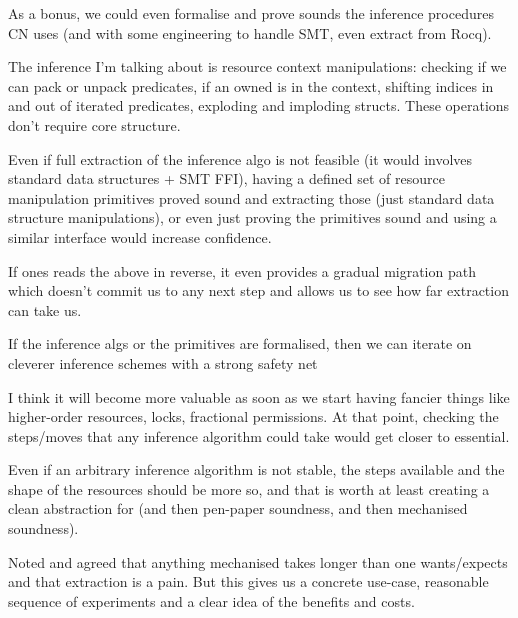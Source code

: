 As a bonus, we could even formalise and prove sounds the inference procedures
CN uses (and with some engineering to handle SMT, even extract from Rocq).

The inference I'm talking about is resource context manipulations: checking if
we can pack or unpack predicates, if an owned is in the context, shifting
indices in and out of iterated predicates, exploding and imploding structs.
These operations don't require core structure.

Even if full extraction of the inference algo is not feasible (it would
involves standard data structures + SMT FFI), having a defined set of resource
manipulation primitives proved sound and extracting those (just standard data
structure manipulations), or even just proving the primitives sound and using a
similar interface would increase confidence.

If ones reads the above in reverse, it even provides a gradual migration path
which doesn't commit us to any next step and allows us to see how far
extraction can take us.

If the inference algs or the primitives are formalised, then we can iterate on
cleverer  inference schemes with a strong safety net

I think it will become more valuable as soon as we start having fancier things
like higher-order resources, locks, fractional permissions. At that point,
checking the steps/moves that any inference algorithm could take would get
closer to essential.

Even if an arbitrary inference algorithm is not stable, the steps available and
the shape of the resources should be more so, and that is worth at least
creating a clean abstraction for (and then pen-paper soundness, and then
mechanised soundness).

Noted and agreed that anything mechanised takes longer than one wants/expects
and that extraction is a pain. But this gives us a concrete use-case,
reasonable sequence of experiments and a clear idea of the benefits and costs.

